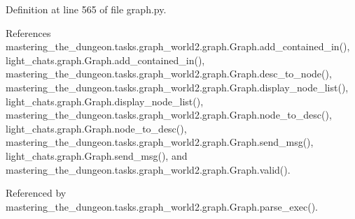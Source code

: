 Definition at line 565 of file graph.\+py.



References mastering\+\_\+the\+\_\+dungeon.\+tasks.\+graph\+\_\+world2.\+graph.\+Graph.\+add\+\_\+contained\+\_\+in(), light\+\_\+chats.\+graph.\+Graph.\+add\+\_\+contained\+\_\+in(), mastering\+\_\+the\+\_\+dungeon.\+tasks.\+graph\+\_\+world2.\+graph.\+Graph.\+desc\+\_\+to\+\_\+node(), mastering\+\_\+the\+\_\+dungeon.\+tasks.\+graph\+\_\+world2.\+graph.\+Graph.\+display\+\_\+node\+\_\+list(), light\+\_\+chats.\+graph.\+Graph.\+display\+\_\+node\+\_\+list(), mastering\+\_\+the\+\_\+dungeon.\+tasks.\+graph\+\_\+world2.\+graph.\+Graph.\+node\+\_\+to\+\_\+desc(), light\+\_\+chats.\+graph.\+Graph.\+node\+\_\+to\+\_\+desc(), mastering\+\_\+the\+\_\+dungeon.\+tasks.\+graph\+\_\+world2.\+graph.\+Graph.\+send\+\_\+msg(), light\+\_\+chats.\+graph.\+Graph.\+send\+\_\+msg(), and mastering\+\_\+the\+\_\+dungeon.\+tasks.\+graph\+\_\+world2.\+graph.\+Graph.\+valid().



Referenced by mastering\+\_\+the\+\_\+dungeon.\+tasks.\+graph\+\_\+world2.\+graph.\+Graph.\+parse\+\_\+exec().


